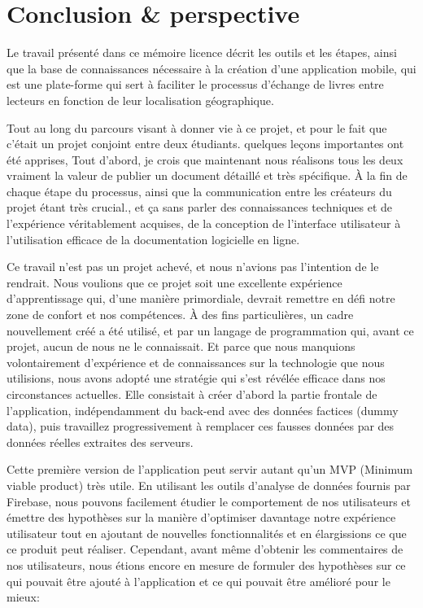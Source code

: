 \newpage

\chapter*{Conclusion \& perspective}

Le travail présenté dans ce mémoire licence décrit les outils et les étapes, ainsi que la base de connaissances nécessaire à la création d'une application mobile, qui est une plate-forme qui sert à faciliter le processus d'échange de livres entre lecteurs en fonction de leur localisation géographique.\medskip

Tout au long du parcours visant à donner vie à ce projet, et pour le fait que c’était un projet conjoint entre deux étudiants. quelques leçons importantes ont été apprises, Tout d’abord, je crois que maintenant nous réalisons tous les deux vraiment la valeur de publier un document détaillé et très spécifique. À la fin de chaque étape du processus, ainsi que la communication entre les créateurs du projet étant très crucial., et ça sans parler des connaissances techniques et de l'expérience véritablement acquises, de la conception de l'interface utilisateur à l'utilisation efficace de la documentation logicielle en ligne.\medskip

Ce travail n’est pas un projet achevé, et nous n’avions pas l’intention de le rendrait. Nous voulions que ce projet soit une excellente expérience d’apprentissage qui, d’une manière primordiale, devrait remettre en défi notre zone de confort et nos compétences. À des fins particulières, un cadre nouvellement créé a été utilisé, et par un langage de programmation qui, avant ce projet, aucun de nous ne le connaissait. Et parce que nous manquions volontairement d'expérience et de connaissances sur la technologie que nous utilisions, nous avons adopté une stratégie qui s'est révélée efficace dans nos circonstances actuelles. Elle consistait à créer d'abord la partie frontale de l'application, indépendamment du \gls{back-end} avec des données factices (\gls{dummy data}), puis travaillez progressivement à remplacer ces fausses données par des données réelles extraites des serveurs.\medskip

Cette première version de l'application peut servir autant qu'un \acrshort{MVP} (Minimum viable product) très utile. En utilisant les outils d'analyse de données fournis par Firebase, nous pouvons facilement étudier le comportement de nos utilisateurs et émettre des hypothèses sur la manière d'optimiser davantage notre expérience utilisateur tout en ajoutant de nouvelles fonctionnalités et en élargissions ce que ce produit peut réaliser. Cependant, avant même d’obtenir les commentaires de nos utilisateurs, nous étions encore en mesure de formuler des hypothèses sur ce qui pouvait être ajouté à l’application et ce qui pouvait être amélioré pour le mieux:

